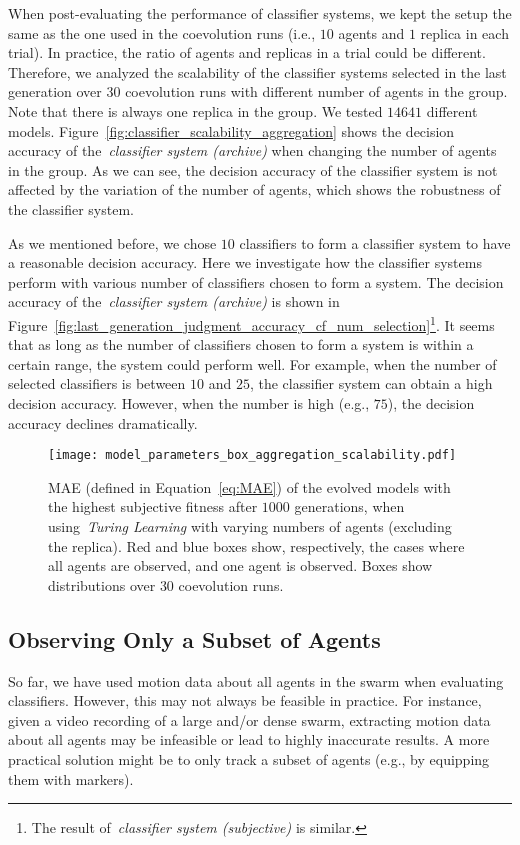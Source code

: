 When post-evaluating the performance of classifier systems, we kept the setup the same as the one used in the coevolution runs (i.e., $10$ agents and $1$ replica in each trial). In practice, the ratio of agents and replicas in a trial could be different. Therefore, we analyzed the scalability of the classifier systems selected in the last generation over $30$ coevolution runs with different number of agents in the group. Note that there is always one replica in the group. We tested $14641$ different models. Figure~\ref{fig:classifier_scalability_aggregation} shows the decision accuracy of the~\textit{classifier system (archive)} when changing the number of agents in the group. As we can see, the decision accuracy of the classifier system is not affected by the variation of the number of agents, which shows the robustness of the classifier system.

As we mentioned before, we chose $10$ classifiers to form a classifier system to have a reasonable decision accuracy. Here we investigate how the classifier systems perform with various number of classifiers chosen to form a system. The decision accuracy of the~\textit{classifier system (archive)} is shown in Figure~\ref{fig:last_generation_judgment_accuracy_cf_num_selection}\footnote{The result of~\textit{classifier system (subjective)} is similar.}. It seems that as long as the number of classifiers chosen to form a system is within a certain range, the system could perform well. For example, when the number of selected classifiers is between $10$ and $25$, the classifier system can obtain a high decision accuracy. However, when the number is high (e.g., $75$), the decision accuracy declines dramatically.
%
\begin{figure}[!t]%
	\centering
	\texttt{[image: model\_parameters\_box\_aggregation\_scalability.pdf]}
	\caption{MAE (defined in Equation~\eqref{eq:MAE}) of the evolved models with the highest subjective fitness after $1000$ generations, when using~\textit{Turing Learning} with varying numbers of agents (excluding the replica). Red and blue boxes show, respectively, the cases where all agents are observed, and one agent is observed. Boxes show distributions over $30$ coevolution runs. }
	\label{fig:model_parameters_box_aggregation_scalability}
\end{figure}
%
\subsection{Observing Only a Subset of Agents}\label{sec:observing_a_subset_agents_swarm_simulation}
So far, we have used motion data about all agents in the swarm when evaluating classifiers. However, this may not always be feasible in practice. For instance, given a video recording of a large and/or dense swarm, extracting motion data about all agents may be infeasible or lead to highly inaccurate results. A more practical solution might be to only track a subset of agents (e.g., by equipping them with markers).


